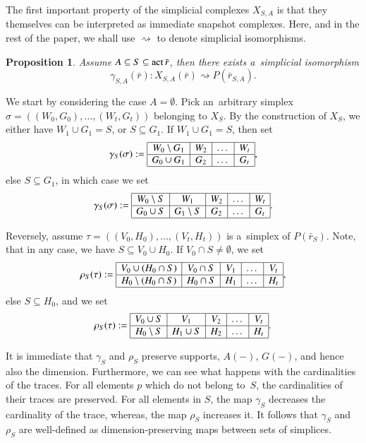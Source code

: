 \documentclass{amsart}[10pt]
\newtheorem{prop}[theorem]{Proposition}
\newcommand{\pr}{\nin{\bf Proof.} }
\newcommand{\act}{\text{\rm act}\,}
\newcommand{\es}{\emptyset}
\newcommand{\sm}{\setminus}
\newcommand{\tr}{{\bar r}}
\numberwithin{equation}{section}
\numberwithin{figure}{section}
\numberwithin{table}{section}
\begin{document}
\nin The first important property of the simplicial complexes
$X_{S,A}$ is that they themselves can be interpreted as immediate
snapshot complexes. Here, and in the rest of the paper, we shall use
$\rightsquigarrow$ to denote simplicial isomorphisms.

\begin{prop}\label{prop:strata}
Assume $A\subseteq S\subseteq\act\tr$, then there exists a~simplicial
isomorphism
\[\gamma_{S,A}(\tr):X_{S,A}(\tr)\rightsquigarrow P(\bar r_{S,A}).\] 
\end{prop}
\pr We start by considering the case $A=\es$. Pick an~arbitrary
simplex $\sigma=((W_0,G_0),\allowbreak \dots,(W_t,G_t))$ belonging to $X_S$.  
By the construction of $X_S$, we either have $W_1\cup G_1=S$, or
$S\subseteq G_1$. If $W_1\cup G_1=S$, then set
\[\gamma_S(\sigma):=\begin{array}{|c|c|c|c|}
\hline
W_0\sm G_1  & W_2 & \dots & W_t \\ \hline
G_0\cup G_1 & G_2 & \dots & G_t \\ 
\hline
\end{array},\]
else $S\subseteq G_1$, in which case we set
\[\gamma_S(\sigma):=\begin{array}{|c|c|c|c|c|}
\hline
W_0\sm  S & W_1      & W_2 & \dots & W_t \\ \hline
G_0\cup S & G_1\sm S & G_2 & \dots & G_t \\ 
\hline
\end{array}.\]

Reversely, assume $\tau=((V_0,H_0),\dots,(V_t,H_t))$ is a~simplex of
$P(\bar r_S)$. Note, that in any case, we have $S\subseteq V_0\cup
H_0$. If $V_0\cap S\neq\es$, we set
\[\rho_S(\tau):=\begin{array}{|c|c|c|c|c|}
\hline
V_0\cup(H_0\cap S) & V_0\cap S & V_1 & \dots & V_t \\ \hline
H_0\sm(H_0\cap S)  & H_0\cap S & H_1 & \dots & H_t \\ 
\hline
\end{array},\]
else $S\subseteq H_0$, and we set
\[\rho_S(\tau):=\begin{array}{|c|c|c|c|c|}
\hline
V_0\cup S & V_1       & V_2 & \dots & V_t \\ \hline
H_0\sm  S & H_1\cup S & H_2 & \dots & H_t \\ 
\hline
\end{array}.\]

It is immediate that $\gamma_S$ and $\rho_S$ preserve supports,
$A(-)$, $G(-)$, and hence also the dimension. Furthermore, we can see
what happens with the cardinalities of the traces. For all elements
$p$ which do not belong to~$S$, the cardinalities of their traces are
preserved. For all elements in $S$, the map $\gamma_S$ decreases the
cardinality of the trace, whereas, the map $\rho_S$ increases it. It
follows that $\gamma_S$ and $\rho_S$ are well-defined as
dimension-preserving maps between sets of simplices.
\end{document}
